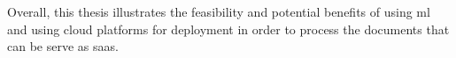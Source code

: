  Overall, this thesis illustrates the feasibility and potential benefits of using \acrlong{ml} and using cloud platforms for deployment in order to process the documents that can be serve as \acrshort{saas}.
















